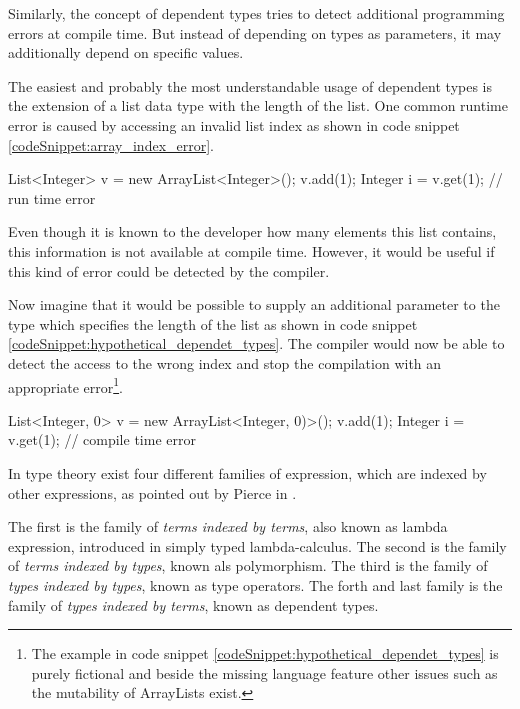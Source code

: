 Similarly, the concept of dependent types tries to detect additional programming errors at compile time.
But instead of depending on types as parameters, it may additionally depend on specific values. 

The easiest and probably the most understandable usage of dependent types is the extension of a list data type with the length of the list. 
One common runtime error is caused by accessing an invalid list index as shown in code snippet \ref{codeSnippet:array_index_error}.

\begin{codesnippet}[caption={ArrayList index error}, label={codeSnippet:array_index_error}]
List<Integer> v = new ArrayList<Integer>();
v.add(1);
Integer i = v.get(1); // run time error
\end{codesnippet}

Even though it is known to the developer how many elements this list contains, this information is not available at compile time. 
However, it would be useful if this kind of error could be detected by the compiler.

Now imagine that it would be possible to supply an additional parameter to the type which specifies the length of the list as shown in code snippet \ref{codeSnippet:hypothetical_dependet_types}. 
The compiler would now be able to detect the access to the wrong index and stop the compilation with an appropriate error\footnote{The example in code snippet \ref{codeSnippet:hypothetical_dependet_types} is purely fictional and beside the missing language feature other issues such as the mutability of ArrayLists exist.}.
\begin{adjustbox}{width=\columnwidth}
\begin{codesnippet}[escapeinside={(*}{*)}, caption={ArrayList with size parameter}, label={codeSnippet:hypothetical_dependet_types}]
List<Integer, 0> v = new ArrayList<Integer, 0)>();
v.add(1);
Integer i = v.get(1); // compile time error
\end{codesnippet}
\end{adjustbox}
\linebreak

In type theory exist four different families of expression, which are indexed by other expressions, as pointed out by Pierce in \cite{10.5555/1076265}. 

The first is the family of \emph{terms indexed by terms}, also known as lambda expression, introduced in simply typed lambda-calculus. 
The second is the family of \emph{terms indexed by types}, known als polymorphism. 
The third is the family of \emph{types indexed by types}, known as type operators.
The forth and last family is the family of \emph{types indexed by terms}, known as dependent types.

